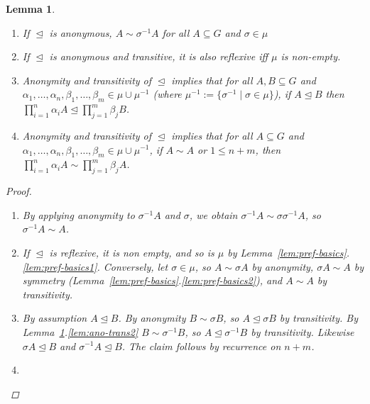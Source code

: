 \documentclass[11pt]{article}
\newtheorem{lemma}[definition]{Lemma}
\newcommand{\releq}{\mathrel{\trianglelefteq}}
\begin{document}
\begin{lemma}\label{lem:ano-trans}
\begin{enumerate}
 \item\label{lem:ano-trans1} If $\releq$ is anonymous, $A \sim \sigma^{-1}A$ for all $A \subseteq G$ and $\sigma \in \mu$

 \item\label{lem:ano-trans2} If $\releq$ is anonymous and transitive, it is also reflexive iff $\mu$ is non-empty.  
 
  \item\label{lem:ano-trans3} Anonymity and transitivity of $\releq$ implies that for all $A, B \subseteq G$ and $\alpha_1,\dots,\alpha_n,\beta_1,\dots, \beta_m \in \mu \cup \mu^{-1}$ (where $\mu^{-1} := \{\sigma^{-1} \mid \sigma \in \mu\}$), if $A \releq B$ then $\prod_{i =1}^n \alpha_i A \releq \prod_{j =1}^m \beta_j B$.
 
 \item\label{lem:ano-trans4} Anonymity and transitivity of $\releq$ implies that for all $A \subseteq G$ and $\alpha_1,\dots,\alpha_n,\beta_1,\dots, \beta_m \in \mu \cup \mu^{-1}$, if $A \sim A$ or $1 \leq n+m$, then $\prod_{i =1}^n \alpha_i A \sim \prod_{j =1}^m \beta_j A$.
 

\end{enumerate}
 \begin{proof}
\begin{enumerate}
 \item By applying anonymity to $\sigma^{-1}A$ and $\sigma$, we obtain $\sigma^{-1}A \sim \sigma \sigma^{-1}A$, so $\sigma^{-1}A \sim A$.
 
 \item If $\releq$ is reflexive, it is non empty, and so is $\mu$ by Lemma~\ref{lem:pref-basics}.\ref{lem:pref-basics1}. Conversely, let $\sigma \in \mu$, so $A \sim \sigma A$ by anonymity, $\sigma A \sim A$ by symmetry (Lemma~\ref{lem:pref-basics}.\ref{lem:pref-basics2}), and $A \sim A$ by transitivity.
 
 \item By assumption $A \releq B$. By anonymity $B \sim \sigma B$, so $A \releq \sigma B$ by transitivity. By Lemma~\ref{lem:ano-trans}.\ref{lem:ano-trans2} $B \sim \sigma^{-1} B$, so $A \releq \sigma^{-1} B$ by transitivity. Likewise $\sigma A \releq B$ and $\sigma^{-1} A \releq B$. The claim follows by recurrence on $n+m$. 
 
 \item 
\end{enumerate}
\end{proof}
 
\end{lemma}
\end{document}
